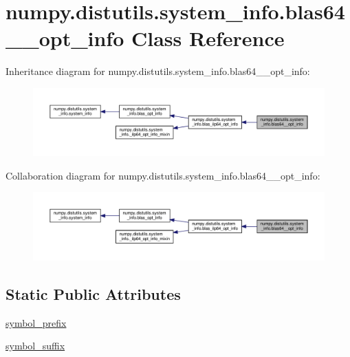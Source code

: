 \hypertarget{classnumpy_1_1distutils_1_1system__info_1_1blas64____opt__info}{}\section{numpy.\+distutils.\+system\+\_\+info.\+blas64\+\_\+\+\_\+opt\+\_\+info Class Reference}
\label{classnumpy_1_1distutils_1_1system__info_1_1blas64____opt__info}


Inheritance diagram for numpy.\+distutils.\+system\+\_\+info.\+blas64\+\_\+\+\_\+opt\+\_\+info\+:
\nopagebreak
\begin{figure}[H]
\begin{center}
\leavevmode
\includegraphics[width=350pt]{classnumpy_1_1distutils_1_1system__info_1_1blas64____opt__info__inherit__graph}
\end{center}
\end{figure}


Collaboration diagram for numpy.\+distutils.\+system\+\_\+info.\+blas64\+\_\+\+\_\+opt\+\_\+info\+:
\nopagebreak
\begin{figure}[H]
\begin{center}
\leavevmode
\includegraphics[width=350pt]{classnumpy_1_1distutils_1_1system__info_1_1blas64____opt__info__coll__graph}
\end{center}
\end{figure}
\subsection*{Static Public Attributes}
\begin{DoxyCompactItemize}
\item 
\hyperlink{classnumpy_1_1distutils_1_1system__info_1_1blas64____opt__info_adfa727fbd901522447e1af76acb0744b}{symbol\+\_\+prefix}
\item 
\hyperlink{classnumpy_1_1distutils_1_1system__info_1_1blas64____opt__info_ac1fbc8f4719e4122054464f6e57a30a0}{symbol\+\_\+suffix}
\end{DoxyCompactItemize}

